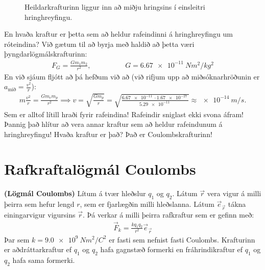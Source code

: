 \ifdefined \wholebook \else\documentclass[oneside]{book}\usepackage{EdlBook}\graphicspath{{figures/}}
\begin{document}
\begin{figure}[H]
    \centering
    \caption{Heildarkrafturinn liggur inn að miðju hringsins í einsleitri hringhreyfingu.}
\end{figure}

En hvaða kraftur er þetta sem að heldur rafeindinni á hringhreyfingu um róteindina? Við gætum til að byrja með haldið að þetta væri þyngdarlögmálskrafturinn:
\begin{align*}
    F_G = \frac{Gm_1m_2}{r^2}, \hspace{2cm} G = \SI{6.67e-11}{Nm^2/kg^2}
\end{align*}
En við sjáum fljótt að þá hefðum við að (við rifjum upp að miðsóknarhröðunin er $a_{\text{mið}} = \frac{v^2}{r}$):
\begin{align*}
    m \frac{v^2}{r} = \frac{Gm_e m_p}{r^2} \implies v = \sqrt{\frac{Gm_p}{r}} = \sqrt{\frac{\SI{6.67e-11}{}\cdot \SI{1.67e-27}{}}{\SI{5.29e-11}{}}} \approx \SI{e-14}{m/s}.
\end{align*}
Sem er alltof lítill hraði fyrir rafeindina! Rafeindir sniglast ekki svona áfram! Þannig það hlítur að vera annar kraftur sem að heldur rafeindunum á hringhreyfingu! Hvaða kraftur er það? Það er Coulombskrafturinn!


\section{Rafkraftalögmál Coulombs}

\begin{tcolorbox}
\begin{theorem}
\textbf{(Lögmál Coulombs)} Lítum á tvær hleðslur $q_1$ og $q_2$. Látum $\Vec{r}$ vera vigur á milli þeirra sem hefur lengd $r$, sem er fjarlægðin milli hleðslanna. Látum $\Vec{e}_{\vec{r}}$ tákna einingarvigur vigursins $\Vec{r}$. Þá verkar á milli þeirra rafkraftur sem er gefinn með:
\begin{align*}
    \vec{F}_k = \frac{kq_1 q_2}{r^2} \Vec{e}_{\vec{r}}
\end{align*}
Þar sem $k = \SI{9.0e9}{Nm^2/C^2}$ er fasti sem nefnist fasti Coulombs. Krafturinn er aðdráttarkraftur ef $q_1$ og $q_2$ hafa gagnstæð formerki en fráhrindikraftur ef $q_1$ og $q_2$ hafa sama formerki.
\end{theorem}
\end{tcolorbox}
\end{document}
